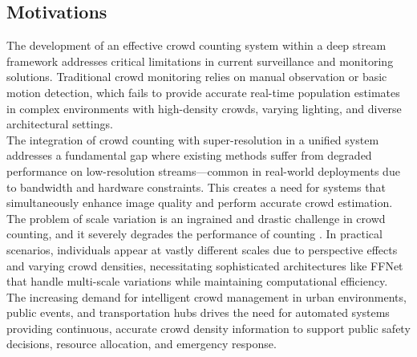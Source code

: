 \subsection{Motivations}
The development of an effective crowd counting system within a deep stream framework addresses critical limitations in current surveillance and monitoring solutions. Traditional crowd monitoring relies on manual observation or basic motion detection, which fails to provide accurate real-time population estimates in complex environments with high-density crowds, varying lighting, and diverse architectural settings.\\
The integration of crowd counting with super-resolution in a unified system addresses a fundamental gap where existing methods suffer from degraded performance on low-resolution streams—common in real-world deployments due to bandwidth and hardware constraints. This creates a need for systems that simultaneously enhance image quality and perform accurate crowd estimation.\\
The problem of scale variation is an ingrained and drastic challenge in crowd counting, and it severely degrades the performance of counting \cite{fan2022survey}. In practical scenarios, individuals appear at vastly different scales due to perspective effects and varying crowd densities, necessitating sophisticated architectures like FFNet that handle multi-scale variations while maintaining computational efficiency.\\
The increasing demand for intelligent crowd management in urban environments, public events, and transportation hubs drives the need for automated systems providing continuous, accurate crowd density information to support public safety decisions, resource allocation, and emergency response.
